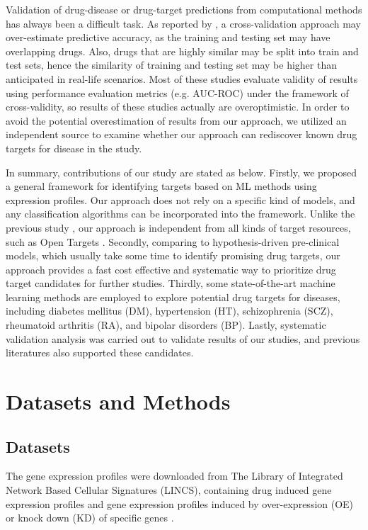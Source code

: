     Validation of drug-disease or drug-target predictions from computational methods has always been a difficult task. As reported by \cite{guney2017reproducible}, a cross-validation approach may over-estimate predictive accuracy, as the training and testing set may have overlapping drugs. Also, drugs that are highly similar may be split into train and test sets, hence the similarity of training and testing set may be higher than anticipated in real-life scenarios. Most of these studies evaluate validity of results using performance evaluation metrics (e.g. AUC-ROC) under the framework of cross-validity, so results of these studies actually are overoptimistic. In order to avoid the potential overestimation of results from our approach, we utilized an independent source to examine whether our approach can rediscover known drug targets for disease in the study. 

    In summary, contributions of our study are stated as below. Firstly, we proposed a general framework for identifying targets based on ML methods using expression profiles. Our approach does not rely on a specific kind of models, and any classification algorithms can be incorporated into the framework. Unlike the previous study \cite{ferrero2017silico}, our approach is independent from all kinds of target resources, such as Open Targets \cite{koscielny2017open}. Secondly, comparing to hypothesis-driven pre-clinical models, which usually take some time to identify promising drug targets, our approach provides a fast cost effective and systematic way to prioritize drug target candidates for further studies. Thirdly, some state-of-the-art machine learning methods are employed to explore potential drug targets for diseases, including diabetes mellitus (DM), hypertension (HT), schizophrenia (SCZ),  rheumatoid arthritis (RA), and bipolar disorders (BP). Lastly, systematic validation analysis was carried out to validate results of our studies, and previous literatures also supported these candidates. 

\section{Datasets and Methods}
  \subsection{Datasets}
    The gene expression profiles were downloaded from The Library of Integrated Network Based Cellular Signatures (LINCS), containing drug induced gene expression profiles and gene  expression profiles induced by over-expression (OE) or knock down (KD) of specific genes \cite{subramanian2017next}. 
      
